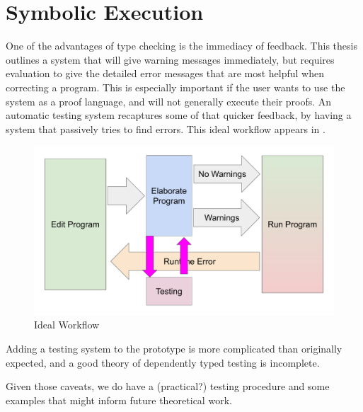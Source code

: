 \section{Symbolic Execution}

One of the advantages of type checking is the immediacy of feedback.
This thesis outlines a system that will give warning messages immediately, but requires evaluation to give the detailed error messages that are most helpful when correcting a program.
This is especially important if the user wants to use the system as a proof language, and will not generally execute their proofs.
An automatic testing system recaptures some of that quicker feedback, by having a system that passively tries to find errors.
This ideal workflow appears in .


\begin{figure}
\includegraphics[width=5in]{fig/best-workflow.pdf}
\caption{Ideal Workflow}
\label{fig:notes-workflow}
\end{figure}
 
Adding a testing system to the prototype is more complicated than originally expected, and a good theory of dependently typed testing is incomplete.
 
Given those caveats, we do have a (practical?) testing procedure and some examples that might inform future theoretical work.
 
